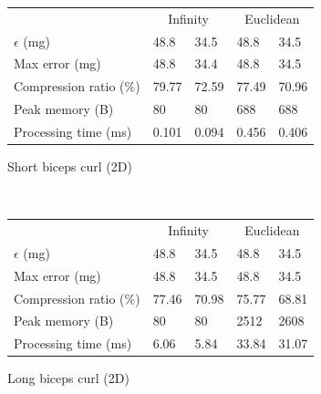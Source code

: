 \documentclass[10pt, conference, compsocconf]{IEEEtran}
\begin{document}
\begin{table}
    \begin{subfigure}{\columnwidth}
    \centering
    \begin{tabular}{l|l|l|l|l}
    \hline
    \rowcolor{headcolor}
                           & \multicolumn{2}{c|}{Infinity} & \multicolumn{2}{c}{Euclidean}\\
    \rowcolor{headcolor}
    $\epsilon$  (mg)          & 48.8         & 34.5       & 48.8       & 34.5 \\
    \hline
    Max error   (mg)          & 48.8         & 34.4       & 48.8       & 34.5 \\
    Compression ratio (\%)    & 79.77        & 72.59      & 77.49      & 70.96\\
    Peak memory   (B)         & 80           & 80         & 688        & 688  \\
    Processing time (ms)      & 0.101        & 0.094      & 0.456      & 0.406\\ \hline
    \end{tabular}
    \caption{Short biceps curl (2D)}
    \end{subfigure}\\
    \begin{subfigure}{\columnwidth}
    \centering
    \begin{tabular}{l|l|l|l|l}
    \hline
    \rowcolor{headcolor}
                   & \multicolumn{2}{c|}{Infinity} & \multicolumn{2}{c}{Euclidean} \\
    \rowcolor{headcolor}
    $\epsilon$ (mg)            & 48.8        & 34.5       & 48.8        & 34.5    \\
    \hline
    Max error  (mg)            & 48.8        & 34.5       & 48.8        & 34.5             \\
    Compression ratio (\%)     & 77.46       & 70.98      & 75.77       & 68.81           \\
    Peak memory  (B)           & 80          & 80         & 2512        & 2608             \\
    Processing time (ms)       & 6.06        & 5.84       & 33.84       & 31.07           \\ \hline
    \end{tabular}
    \caption{Long biceps curl (2D)}
    \end{subfigure}\\
    \begin{subfigure}{\columnwidth}
    \centering
    \begin{tabular}{l|l|l|l|l}

\end{tabular}
\end{subfigure}
\end{table}
\end{document}
